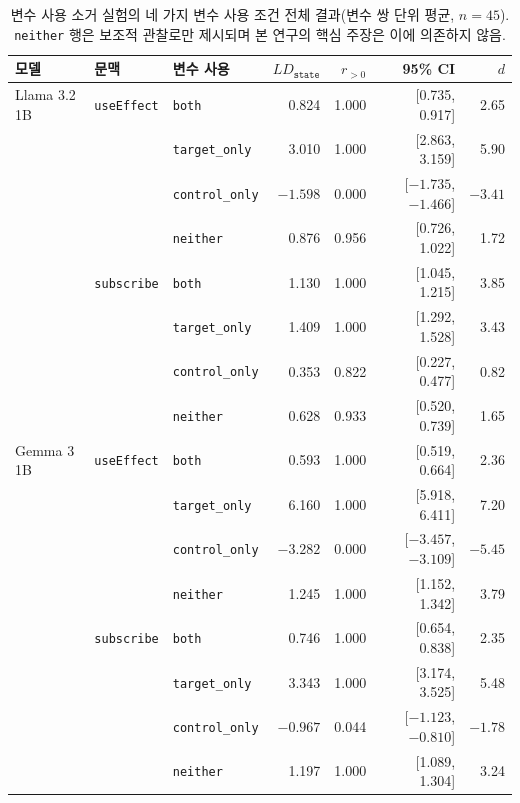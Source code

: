 \begin{table}[t]
  \centering
  \small
  \begin{supertabular}{lllrrrr}
    \toprule
    \textbf{모델} & \textbf{문맥} & \textbf{변수 사용} & $LD_{\texttt{state}}$ & $r_{>0}$ & \textbf{95\% CI} & \textbf{$d$} \\
    \midrule
    Llama 3.2 1B & \texttt{useEffect} & \texttt{both} & 0.824 & 1.000 & [0.735, 0.917] & 2.65 \\
    & & \texttt{target\_only} & 3.010 & 1.000 & [2.863, 3.159] & 5.90 \\
    & & \texttt{control\_only} & $-1.598$ & 0.000 & [$-1.735$, $-1.466$] & $-3.41$ \\
    & & \texttt{neither} & 0.876 & 0.956 & [0.726, 1.022] & 1.72 \\
    \cmidrule(l){2-7}
    & \texttt{subscribe} & \texttt{both} & 1.130 & 1.000 & [1.045, 1.215] & 3.85 \\
    & & \texttt{target\_only} & 1.409 & 1.000 & [1.292, 1.528] & 3.43 \\
    & & \texttt{control\_only} & 0.353 & 0.822 & [0.227, 0.477] & 0.82 \\
    & & \texttt{neither} & 0.628 & 0.933 & [0.520, 0.739] & 1.65 \\
    \midrule
    Gemma 3 1B & \texttt{useEffect} & \texttt{both} & 0.593 & 1.000 & [0.519, 0.664] & 2.36 \\
    & & \texttt{target\_only} & 6.160 & 1.000 & [5.918, 6.411] & 7.20 \\
    & & \texttt{control\_only} & $-3.282$ & 0.000 & [$-3.457$, $-3.109$] & $-5.45$ \\
    & & \texttt{neither} & 1.245 & 1.000 & [1.152, 1.342] & 3.79 \\
    \cmidrule(l){2-7}
    & \texttt{subscribe} & \texttt{both} & 0.746 & 1.000 & [0.654, 0.838] & 2.35 \\
    & & \texttt{target\_only} & 3.343 & 1.000 & [3.174, 3.525] & 5.48 \\
    & & \texttt{control\_only} & $-0.967$ & 0.044 & [$-1.123$, $-0.810$] & $-1.78$ \\
    & & \texttt{neither} & 1.197 & 1.000 & [1.089, 1.304] & 3.24 \\
    \bottomrule
  \end{supertabular}
  \caption{변수 사용 소거 실험의 네 가지 변수 사용 조건 전체 결과(변수 쌍 단위 평균, $n=45$). \texttt{neither} 행은 보조적 관찰로만 제시되며 본 연구의 핵심 주장은 이에 의존하지 않음.}
  \label{tab:app-ablationC-full}
\end{table}

